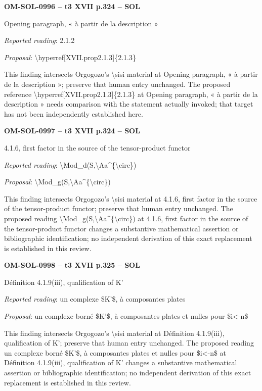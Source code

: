\par\noindent\textbf{OM-SOL-0996 -- t3 XVII p.324 -- SOL}\par
Opening paragraph, « à partir de la description »\par
\emph{Reported reading}: 2.1.2\par
\emph{Proposal}: \textbackslash{}hyperref[XVII.prop2.1.3]\{2.1.3\}\par
This finding intersects Orgogozo's \textbackslash{}sisi material at Opening paragraph, « à partir de la description »; preserve that human entry unchanged. The proposed reference \textbackslash{}hyperref[XVII.prop2.1.3]\{2.1.3\} at Opening paragraph, « à partir de la description » needs comparison with the statement actually invoked; that target has not been independently established here.\par
\par\noindent\textbf{OM-SOL-0997 -- t3 XVII p.324 -- SOL}\par
4.1.6, first factor in the source of the tensor-product functor\par
\emph{Reported reading}: \textbackslash{}Mod\_d(S,\textbackslash{}Aa\textasciicircum{}\{\textbackslash{}circ\})\par
\emph{Proposal}: \textbackslash{}Mod\_g(S,\textbackslash{}Aa\textasciicircum{}\{\textbackslash{}circ\})\par
This finding intersects Orgogozo's \textbackslash{}sisi material at 4.1.6, first factor in the source of the tensor-product functor; preserve that human entry unchanged. The proposed reading \textbackslash{}Mod\_g(S,\textbackslash{}Aa\textasciicircum{}\{\textbackslash{}circ\}) at 4.1.6, first factor in the source of the tensor-product functor changes a substantive mathematical assertion or bibliographic identification; no independent derivation of this exact replacement is established in this review.\par
\par\noindent\textbf{OM-SOL-0998 -- t3 XVII p.325 -- SOL}\par
Définition 4.1.9(iii), qualification of K'\par
\emph{Reported reading}: un complexe \$K'\$, à composantes plates\par
\emph{Proposal}: un complexe borné \$K'\$, à composantes plates et nulles pour \$i<-n\$\par
This finding intersects Orgogozo's \textbackslash{}sisi material at Définition 4.1.9(iii), qualification of K'; preserve that human entry unchanged. The proposed reading un complexe borné \$K'\$, à composantes plates et nulles pour \$i<-n\$ at Définition 4.1.9(iii), qualification of K' changes a substantive mathematical assertion or bibliographic identification; no independent derivation of this exact replacement is established in this review.\par

